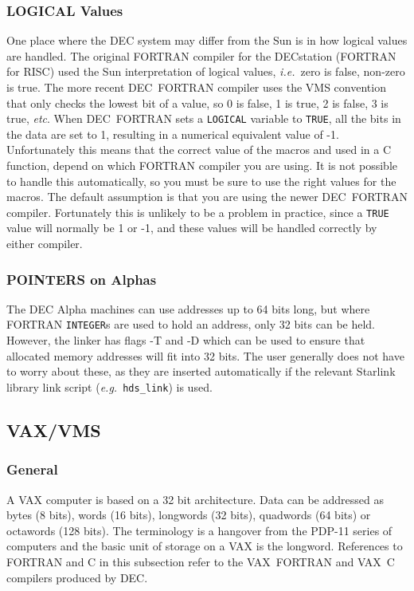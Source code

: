 \documentclass[twoside,11pt,nolof]{starlink}
\begin{document}
\subsubsection{LOGICAL Values}
One place where the DEC system may differ from the Sun is in how logical
values are handled. The original FORTRAN compiler for the DECstation (FORTRAN
for RISC) used the Sun interpretation of logical values, \textit{i.e.}\ zero is
false, non-zero is true. The more recent DEC~FORTRAN compiler uses the VMS
convention that only checks the lowest bit of a value, so 0 is false, 1 is
true, 2 is false, 3 is true, \textit{etc}.
When DEC~FORTRAN sets a \texttt{LOGICAL} variable to \texttt{TRUE}, all the
bits in the data are set to 1, resulting in a numerical equivalent value of -1.
Unfortunately this means that the correct value of the
macros
and
used in a C function, depend on which FORTRAN compiler you are using.
It is not possible to handle this
automatically, so you must be sure to use the right values for the macros. The
default assumption is that you are using the newer DEC~FORTRAN compiler.
Fortunately this is unlikely to be a problem in practice,
since a \texttt{TRUE} value will normally be 1 or -1, and these values will be
handled correctly by either compiler.

\subsubsection{POINTERS on Alphas}
The DEC Alpha machines can use addresses up to 64 bits long, but where
FORTRAN \texttt{INTEGER}s are used to hold an address, only 32 bits
can be held.  However, the linker has flags -T and -D which can be
used to ensure that allocated memory addresses will fit into 32
bits. The user generally does not have to worry about these, as they
are inserted automatically if the relevant Starlink library link
script (\textit{e.g.}\ \texttt{hds\_link}) is used.

\subsection{VAX/VMS}

\subsubsection{General}

A VAX computer is based on a 32 bit architecture. Data can be addressed as
bytes (8 bits), words (16 bits), longwords (32 bits), quadwords (64 bits) or
octawords (128 bits). The terminology is a hangover from the PDP-11 series of
computers and the basic unit of storage on a VAX is the longword. References to
FORTRAN and C in this subsection refer to the VAX~FORTRAN and VAX~C compilers
produced by DEC\@.
\end{document}
